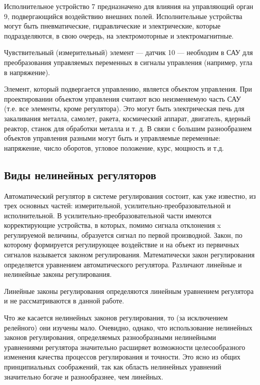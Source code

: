 Исполнительное устройство 7 предназначено для влияния на управляющий орган 9, подвергающийся воздействию внешних полей. Исполнительные устройства могут быть пневматические, гидравлические и электрические, которые подразделяются, в свою очередь, на электромоторные и электромагнитные.

Чувствительный (измерительный) элемент — датчик 10 — необходим в САУ для преобразования управляемых переменных в сигналы управления (например, угла в напряжение).

Элемент, который подвергается управлению, является объектом управления. При проектировании объектом управления считают всю неизменяемую часть САУ (т.е. все элементы, кроме регулятора). Это могут быть электрическая печь для закаливания металла, самолет, ракета, космический аппарат, двигатель, ядерный реактор, станок для обработки металла и т. д. В связи с большим разнообразием объектов управления разными могут быть и управляемые переменные: напряжение, число оборотов, угловое положение, курс, мощность и т.д.

\subsection{Виды нелинейных регуляторов}
\label{sub:domain:2}

Автоматический регулятор в системе регулирования состоит, как уже известно, из трех основных частей: измерительной, усилительно-преобразовательной и исполнительной. В усилительно-преобразовательной части имеются корректирующие устройства, в которых, помимо сигнала отклонения x регулируемой величины, образуется сигнал по первой производной. Закон, по которому формируется регулирующее воздействие и на объект из первичных сигналов называется законом регулирования. Математически закон регулирования определяется уравнением автоматического регулятора. Различают линейные и нелинейные законы регулирования.

Линейные законы регулирования определяются линейным уравнением регулятора и не рассматриваются в данной работе.

Что же касается нелинейных законов регулирования, то (за исключением релейного) они изучены мало. Очевидно, однако, что использование нелинейных законов регулирования, определяемых разнообразными нелинейными уравнениями регулятора значительно расширяет возможности целесообразного изменения качества процессов регулирования и точности. Это ясно из общих принципиальных соображений, так как область нелинейных уравнений значительно богаче и разнообразнее, чем линейных.

